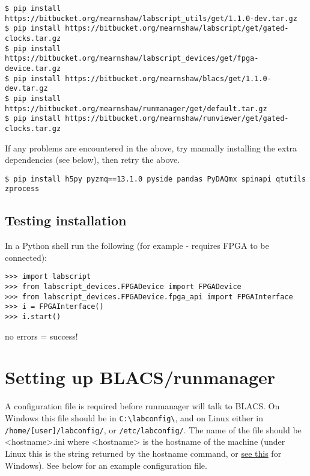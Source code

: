 \documentclass[11pt,a4paper]{article}
\begin{document}
\begin{verbatim}
$ pip install https://bitbucket.org/mearnshaw/labscript_utils/get/1.1.0-dev.tar.gz
$ pip install https://bitbucket.org/mearnshaw/labscript/get/gated-clocks.tar.gz
$ pip install https://bitbucket.org/mearnshaw/labscript_devices/get/fpga-device.tar.gz
$ pip install https://bitbucket.org/mearnshaw/blacs/get/1.1.0-dev.tar.gz
$ pip install https://bitbucket.org/mearnshaw/runmanager/get/default.tar.gz
$ pip install https://bitbucket.org/mearnshaw/runviewer/get/gated-clocks.tar.gz
\end{verbatim}

If any problems are encountered in the above, try manually installing the extra dependencies (see below), then retry the above.

\begin{verbatim}
$ pip install h5py pyzmq==13.1.0 pyside pandas PyDAQmx spinapi qtutils zprocess
\end{verbatim}

\subsection{Testing installation}
In a Python shell run the following (for example - requires FPGA to be connected):

\begin{verbatim}
>>> import labscript
>>> from labscript_devices.FPGADevice import FPGADevice
>>> from labscript_devices.FPGADevice.fpga_api import FPGAInterface
>>> i = FPGAInterface()
>>> i.start()
\end{verbatim}

no errors = success!

\section{Setting up BLACS/runmanager}
A configuration file is required before runmanager will talk to BLACS. On Windows this file should be in \texttt{C:\textbackslash{}labconfig\textbackslash{}}, and on Linux either in \texttt{/home/[user]/labconfig/}, or \texttt{/etc/labconfig/}. The name of the file should be \textless{}hostname\textgreater{}.ini where \textless{}hostname\textgreater{} is the hostname of the machine (under Linux this is the string returned by the hostname command, or \href{http://windows.microsoft.com/en-gb/windows/find-computer-name}{see this} for Windows). See below for an example configuration file.
\end{document}
